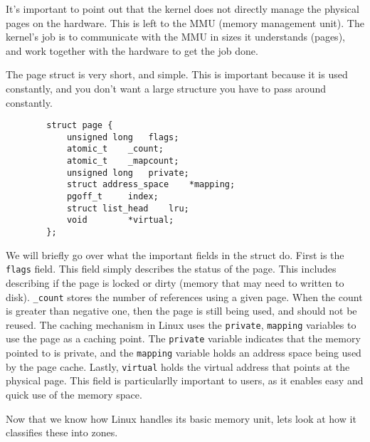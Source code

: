 \documentclass[10pt,letterpaper,onecolumn,draftclsnofoot]{IEEEtran}
\begin{document}
	It's important to point out that the kernel does not directly manage the
	physical pages on the hardware. This is left to the MMU (memory
	management unit). The kernel's job is to communicate with the MMU in
	sizes it understands (pages), and work together with the hardware to
	get the job done. 

	The page struct is very short, and simple. This is important because it
	is used constantly, and you don't want a large structure you have to 
	pass around constantly. \cite{robertlove2010}

	\begin{lstlisting}
		struct page {
			unsigned long	flags;
			atomic_t	_count;
			atomic_t	_mapcount;
			unsigned long	private;
			struct address_space	*mapping;
			pgoff_t		index;
			struct list_head	lru;
			void 		*virtual;
		};
	\end{lstlisting}
	
	We will briefly go over what the important fields in the struct do.
	First is the \texttt{flags} field. This field simply describes the
	status of the page. This includes describing if the page is locked or
	dirty (memory that may need to written to disk). \texttt{\_count}
	stores the number of references using a given page. When the count is
	greater than negative one, then the page is still being used, and should
	not be reused. The caching mechanism in Linux uses the \texttt{private},
	\texttt{mapping} variables to use the page as a caching point. The
	\texttt{private} variable indicates that the memory pointed to is private,
	and the \texttt{mapping} variable holds an address space being used by
	the page cache. Lastly, \texttt{virtual} holds the virtual address that
	points at the physical page. This field is particularlly important to
	users, as it enables easy and quick use of the memory space.

	Now that we know how Linux handles its basic memory unit, lets look at
	how it classifies these into zones. 
\end{document}
